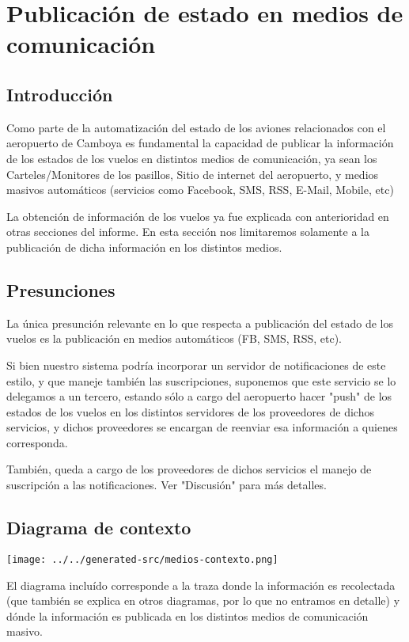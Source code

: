 \section{Publicación de estado en medios de comunicación}
\subsection{Introducción}
Como parte de la automatización del estado de los aviones relacionados con el aeropuerto de Camboya es fundamental la capacidad de publicar la información de los estados de los vuelos en distintos medios de comunicación, ya sean los Carteles/Monitores de los pasillos, Sitio de internet del aeropuerto, y medios masivos automáticos (servicios como Facebook, SMS, RSS, E-Mail, Mobile, etc)

La obtención de información de los vuelos ya fue explicada con anterioridad en otras secciones del informe. En esta sección nos limitaremos solamente a la publicación de dicha información en los distintos medios.

\subsection{Presunciones}
La única presunción relevante en lo que respecta a publicación del estado de los vuelos es la publicación en medios automáticos (FB, SMS, RSS, etc).

Si bien nuestro sistema podría incorporar un servidor de notificaciones de este estilo, y que maneje también las suscripciones, suponemos que este servicio se lo delegamos a un tercero, estando sólo a cargo del aeropuerto hacer "push" de los estados de los vuelos en los distintos servidores de los proveedores de dichos servicios, y dichos proveedores se encargan de reenviar esa información a quienes corresponda.

También, queda a cargo de los proveedores de dichos servicios el manejo de suscripción a las notificaciones. Ver "Discusión" para más detalles. 

\subsection{Diagrama de contexto}
\texttt{[image: ../../generated-src/medios-contexto.png]}

El diagrama incluído corresponde a la traza donde la información es recolectada (que también se explica en otros diagramas, por lo que no entramos en detalle) y dónde la información es publicada en los distintos medios de comunicación masivo.

